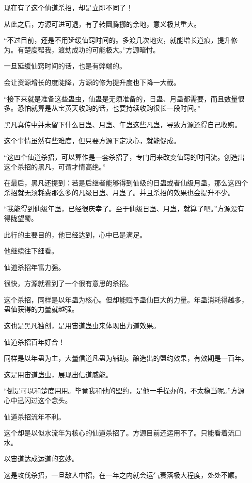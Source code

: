 \begin{this_body}
现在有了这个仙道杀招，却是立即不同了！

从此之后，方源可进可退，有了转圜腾挪的余地，意义极其重大。

“不过目前，还是不用延缓仙窍时间的。多渡几次地灾，就能增长道痕，提升修为。有楚度帮我，渡劫成功的可能极大。”方源暗忖。

一旦延缓仙窍时间的话，也是有弊端的。

会让资源增长的度陡降，方源的修为提升度也下降一大截。

“接下来就是准备这些蛊虫，仙蛊是无须准备的，日蛊、月蛊都需要，而且数量很多。恐怕就算是从宝黄天收购的话，也要持续收购很长一段时间。”

黑凡真传中并未留下什么日蛊、月蛊、年蛊这些凡蛊，导致方源还得自己收购。

这个事情虽然有些难度，但只要方源下定决心，就能促成。

“这四个仙道杀招，可以算作是一套杀招了，专门用来改变仙窍的时间流。创造出这个杀招的黑凡，可谓才情高绝。”

在最后，黑凡还提到：若是后继者能够得到仙级的日蛊或者仙级月蛊，那么这四个杀招就无须耗费那么多的凡级日蛊、月蛊了。并且杀招的效果也会提升不少。

“我能得到仙级年蛊，已经很庆幸了。至于仙级日蛊、月蛊，就算了吧。”方源没有得陇望蜀。

此行的主要目的，他已经达到，心中已是满足。

他继续往下细看。

仙道杀招年富力强。

很快，方源就看到了一个很有意思的杀招。

这个杀招，同样是以年蛊为核心。但却能赋予蛊仙巨大的力量。年蛊消耗得越多，蛊仙获得的力量就越强。

这也是黑凡独创，是用宙道蛊虫来体现出力道效果。

仙道杀招百年好合！

同样是以年蛊为主，大量信道凡蛊为辅助。酿造出的盟约效果，有效期是一百年。

这是用宙道蛊虫，展现出信道威能。

“倒是可以和楚度用用。毕竟我和他的盟约，是他一手操办的，不太稳当呢。”方源心中迅闪过这个念头。

仙道杀招流年不利。

这个却是以似水流年为核心的仙道杀招了。方源目前还运用不了。只能看着流口水。

以宙道达成运道的玄妙。

这是攻伐杀招，一旦敌人中招，在一年之内就会运气衰落极大程度，处处不顺。


\end{this_body}

